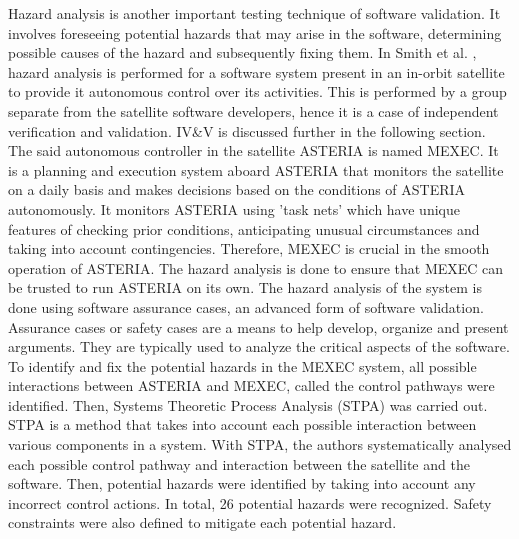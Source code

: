 \documentclass[journal, onecolumn]{IEEEtran}
\begin{document}
	Hazard analysis is another important testing technique of software validation. It involves foreseeing potential hazards that may arise in the software, determining possible causes of the hazard and subsequently fixing them. 
	\newline \newline
	In Smith et al. \cite{hazard}, hazard analysis is performed for a software system present in an in-orbit satellite to provide it autonomous control over its activities. This is performed by a group separate from the satellite software developers, hence it is a case of independent verification and validation. IV\&V is discussed further in the following section.
	\newline \newline
	The said autonomous controller in the satellite ASTERIA is named MEXEC. It is a planning and execution system aboard ASTERIA that monitors the satellite on a daily basis and makes decisions based on the conditions of ASTERIA autonomously. It monitors ASTERIA using 'task nets' which have unique features of checking prior conditions, anticipating unusual circumstances and taking into account contingencies. Therefore, MEXEC is crucial in the smooth operation of ASTERIA. The hazard analysis is done to ensure that MEXEC can be trusted to run ASTERIA on its own.
	\newline \newline
	The hazard analysis of the system is done using software assurance cases, an advanced form of software validation.  Assurance cases or safety cases are a means to help develop, organize and present arguments. They are typically used to analyze the critical aspects of the software.
	\newline \newline
	To identify and fix the potential hazards in the MEXEC system, all possible interactions between ASTERIA and MEXEC, called the control pathways were identified. 
	\newline \newline
	Then, Systems Theoretic Process Analysis (STPA) was carried out. STPA is a method that takes into account each possible interaction between various components in a system. With STPA, the authors systematically analysed each possible control pathway and interaction between the satellite and the software. 
	Then, potential hazards were identified by taking into account any incorrect control actions. In total, 26 potential hazards were recognized. Safety constraints were also defined to mitigate each potential hazard. 
\end{document}
